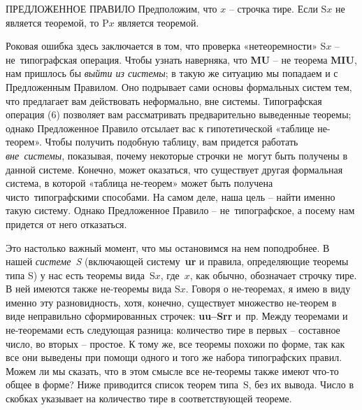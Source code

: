 \documentclass[../main.tex]{subfiles}
\begin{document}
\begin{mybox}{ПРЕДЛОЖЕННОЕ ПРАВИЛО}
    Предположим, что $x$ \--- строчка тире.
    Если S$x$ не является теоремой, то P$x$ является теоремой.
\end{mybox}

Роковая ошибка здесь заключается в том, что проверка «нетеоремности» S$x$ \--- не~типографская операция. Чтобы узнать наверняка, что \textbf{MU} \--- не теорема \textbf{MIU}, нам пришлось бы \emph{выйти из системы}; в такую же ситуацию мы попадаем и с Предложенным Правилом. Оно подрывает сами основы формальных систем тем, что предлагает вам действовать неформально, вне системы. Типографская операция (6) позволяет вам рассматривать предварительно выведенные теоремы; однако Предложенное Правило отсылает вас к гипотетической «таблице не-теорем». Чтобы получить подобную таблицу, вам придется работать \emph{вне~системы}, показывая, почему некоторые строчки не~могут быть получены в данной системе. Конечно, может оказаться, что существует другая формальная система, в которой «таблица не-теорем» может быть получена чисто~типографскими способами. На самом деле, наша цель \--- найти именно такую систему. Однако Предложенное Правило \--- не~типографское, а посему нам придется от него отказаться.

Это настолько важный момент, что мы остановимся на нем поподробнее. В нашей \emph{системе~S} (включающей систему~\textbf{ur} и правила, определяющие теоремы типа S) у нас есть теоремы вида~S$x$, где~$x$, как обычно, обозначает строчку тире. В ней имеются также не-теоремы вида S$x$. Говоря о не-теоремах, я имею в виду именно эту разновидность, хотя, конечно, существует множество не-теорем в виде неправильно сформированных строчек: \textbf{uu--Srr} и~пр. Между теоремами и не-теоремами есть следующая разница: количество тире в первых \--- составное число, во вторых \--- простое. К тому же, все теоремы похожи по форме, так как все они выведены при помощи одного и того же набора типографских правил. Можем ли мы сказать, что в этом смысле все не-теоремы также имеют что-то общее в форме? Ниже приводится список теорем типа~S, без их вывода. Число в скобках указывает на количество тире в соответствующей теореме.
\end{document}
